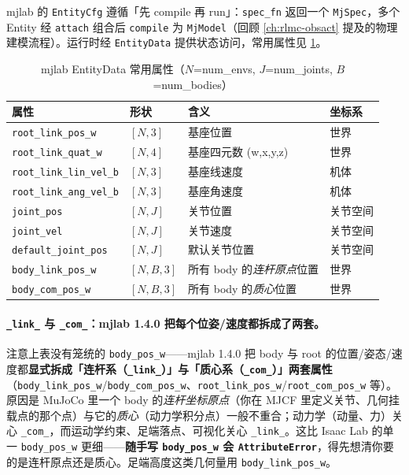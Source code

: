 mjlab 的 \verb|EntityCfg| 遵循「先 compile 再 run」：\verb|spec_fn| 返回一个 \verb|MjSpec|，多个 Entity 经 \verb|attach| 组合后 \verb|compile| 为 \verb|MjModel|（回顾 \cref{ch:rlmc-obsact} 提及的物理建模流程）。运行时经 \verb|EntityData| 提供状态访问，常用属性见 \cref{tab:rlmc-mgr-entitydata}。

\begin{table}[ht]
\centering
\caption{mjlab EntityData 常用属性（$N$=num\_envs, $J$=num\_joints, $B$=num\_bodies）}
\label{tab:rlmc-mgr-entitydata}
\small
\begin{tabular}{@{}llll@{}}
\toprule
属性 & 形状 & 含义 & 坐标系 \\
\midrule
\verb|root_link_pos_w| & $[N,3]$ & 基座位置 & 世界 \\
\verb|root_link_quat_w| & $[N,4]$ & 基座四元数 (w,x,y,z) & 世界 \\
\verb|root_link_lin_vel_b| & $[N,3]$ & 基座线速度 & 机体 \\
\verb|root_link_ang_vel_b| & $[N,3]$ & 基座角速度 & 机体 \\
\verb|joint_pos| & $[N,J]$ & 关节位置 & 关节空间 \\
\verb|joint_vel| & $[N,J]$ & 关节速度 & 关节空间 \\
\verb|default_joint_pos| & $[N,J]$ & 默认关节位置 & 关节空间 \\
\verb|body_link_pos_w| & $[N,B,3]$ & 所有 body 的\emph{连杆原点}位置 & 世界 \\
\verb|body_com_pos_w| & $[N,B,3]$ & 所有 body 的\emph{质心}位置 & 世界 \\
\bottomrule
\end{tabular}
\end{table}

\paragraph{\texttt{\_link\_} 与 \texttt{\_com\_}：mjlab 1.4.0 把每个位姿/速度都拆成了两套。}注意上表没有笼统的 \verb|body_pos_w|——mjlab 1.4.0 把 body 与 root 的位置/姿态/速度都\textbf{显式拆成「连杆系（\texttt{\_link\_}）」与「质心系（\texttt{\_com\_}）」两套属性}（\verb|body_link_pos_w|/\verb|body_com_pos_w|、\verb|root_link_pos_w|/\verb|root_com_pos_w| 等）。原因是 MuJoCo 里一个 body 的\emph{连杆坐标原点}（你在 MJCF 里定义关节、几何挂载点的那个点）与它的\emph{质心}（动力学积分点）一般不重合；动力学（动量、力）关心 \texttt{\_com\_}，而运动学约束、足端落点、可视化关心 \texttt{\_link\_}。这比 Isaac Lab 的单一 \verb|body_pos_w| 更细——\textbf{随手写 \texttt{body\_pos\_w} 会 \texttt{AttributeError}}，得先想清你要的是连杆原点还是质心。足端高度这类几何量用 \verb|body_link_pos_w|。

